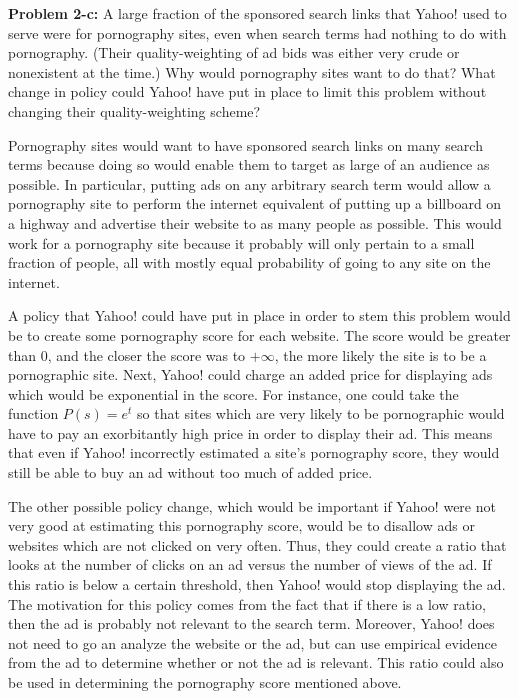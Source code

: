 \documentclass[psamsfonts]{amsart}
\newenvironment{sol}{\vspace{0.25cm}{\large \bfseries Solution:}}{\qedsymbol}
\newenvironment{prob}[1]{\begin{framed}{\large \bfseries Problem #1:}}{\end{framed}}
\begin{document}
\begin{prob}{2-c}
A large fraction of the sponsored search links that Yahoo! used to serve were for pornography sites, even when search terms had nothing to do with pornography. (Their quality-weighting of ad bids was either very crude or nonexistent at the time.) Why would pornography sites want to do that? What change in policy could Yahoo! have put in place to limit this problem without changing their quality-weighting scheme?
\end{prob}
\begin{sol}
Pornography sites would want to have sponsored search links on many search terms because doing so would enable them to target as large of an audience as possible. In particular, putting ads on any arbitrary search term would allow a pornography site to perform the internet equivalent of putting up a billboard on a highway and advertise their website to as many people as possible. This would work for a pornography site because it probably will only pertain to a small fraction of people, all with mostly equal probability of going to any site on the internet. 

A policy that Yahoo! could have put in place in order to stem this problem would be to create some pornography score for each website. The score would be greater than 0, and the closer the score was to $+ \infty$, the more likely the site is to be a pornographic site. Next, Yahoo! could charge an added price for displaying ads which would be exponential in the score. For instance, one could take the function $P(s) = e^{t}$ so that sites which are very likely to be pornographic would have to pay an exorbitantly high price in order to display their ad. This means that even if Yahoo! incorrectly estimated a site's pornography score, they would still be able to buy an ad without too much of added price.

The other possible policy change, which would be important if Yahoo! were not very good at estimating this pornography score, would be to disallow ads or websites which are not clicked on very often. Thus, they could create a ratio that looks at the number of clicks on an ad versus the number of views of the ad. If this ratio is below a certain threshold, then Yahoo! would stop displaying the ad. The motivation for this policy comes from the fact that if there is a low ratio, then the ad is probably not relevant to the search term. Moreover, Yahoo! does not need to go an analyze the website or the ad, but can use empirical evidence from the ad to determine whether or not the ad is relevant. This ratio could also be used in determining the pornography score mentioned above. 
\end{sol}
\end{document}
